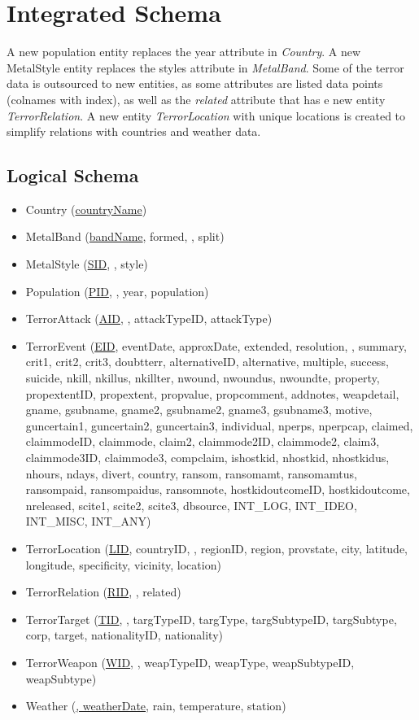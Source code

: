 \section{Integrated Schema}
A new population entity replaces the year attribute in \emph{Country}. A new MetalStyle entity replaces the styles attribute in \emph{MetalBand}. Some of the terror data is outsourced to new entities, as some attributes are listed data points (colnames with index), as well as the \emph{related} attribute that has e new entity \emph{TerrorRelation}. A new entity \emph{TerrorLocation} with unique locations is created to simplify relations with countries and weather data.
    
\subsection{Logical Schema}
\begin{itemize}
\item Country (\underline{countryName})
\item MetalBand (\underline{bandName}, formed, , split)
\item MetalStyle (\underline{SID}, , style)
\item Population (\underline{PID}, , year, population)
\item TerrorAttack (\underline{AID}, , attackTypeID, attackType)
\item TerrorEvent (\underline{EID}, eventDate, approxDate, extended, resolution, , summary, crit1, crit2, crit3, doubtterr, alternativeID, alternative, multiple, success, suicide, nkill, nkillus, nkillter, nwound, nwoundus, nwoundte, property, propextentID, propextent, propvalue, propcomment, addnotes, weapdetail, gname, gsubname, gname2, gsubname2, gname3, gsubname3, motive, guncertain1, guncertain2, guncertain3, individual, nperps, nperpcap, claimed, claimmodeID, claimmode, claim2, claimmode2ID, claimmode2, claim3, claimmode3ID, claimmode3, compclaim, ishostkid, nhostkid, nhostkidus, nhours, ndays, divert, country, ransom, ransomamt, ransomamtus, ransompaid, ransompaidus, ransomnote, hostkidoutcomeID, hostkidoutcome, nreleased, scite1, scite2, scite3, dbsource, INT\_LOG, INT\_IDEO, INT\_MISC, INT\_ANY)
\item TerrorLocation (\underline{LID}, countryID, , regionID, region, provstate, city, latitude, longitude, specificity, vicinity, location)
\item TerrorRelation (\underline{RID}, , {related})
\item TerrorTarget (\underline{TID}, , targTypeID, targType, targSubtypeID, targSubtype, corp, target, nationalityID, nationality)
\item TerrorWeapon (\underline{WID}, , weapTypeID, weapType, weapSubtypeID, weapSubtype)
\item Weather (\underline{, weatherDate}, rain, temperature, station)
\end{itemize}


